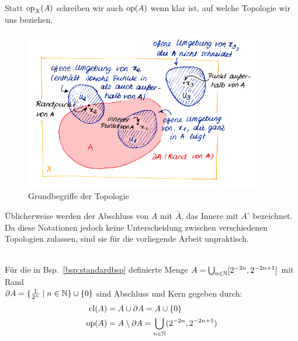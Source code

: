     \begin{konv}
        Statt $\text{op}_X(A)$ schreiben wir auch $\text{op}(A)$ wenn klar ist, auf welche Topologie wir uns beziehen.
    \end{konv}

    \begin{figure}[ht]
        \centering
        \includegraphics[height=7cm]{abb/top-grundbegr.png}
        \caption{Grundbegriffe der Topologie}
        \label{fig:top-grundbegr}
    \end{figure}


    \begin{bem}
        Üblicherweise werden der Abschluss von $A$ mit $\bar A$, das Innere mit $A^\circ$ bezeichnet. Da diese Notationen jedoch keine Unterscheidung zwischen verschiedenen Topologien zulassen, sind sie für die vorliegende Arbeit unpraktisch.
    \end{bem}
    
    \begin{bsp}\label{bsp:standardbsp-abschl-kern}\ \\
        Für die in Bsp.\ \ref{bsp:standardbsp} definierte Menge ${A = \bigcup_{n \in \mathbb{N}} [2^{-2n}, 2^{-2n+1}]}$ mit Rand\\${\partial A = \{\frac{1}{2^n} \mid n \in \mathbb{N}\} \cup \{0\}}$ sind Abschluss und Kern gegeben durch:
        \begin{align*}
            \text{cl}(A) &= A \cup \partial A = A \cup \{0\}\\
            \text{op}(A) &= A \setminus \partial A = \bigcup_{n \in \mathbb{N}} (2^{-2n}, 2^{-2n+1})
        \end{align*}
    \end{bsp}

